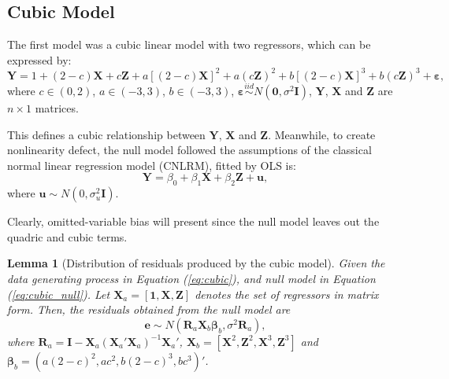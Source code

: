 \documentclass{monashthesis}
\newtheorem{lemma}{Lemma}[chapter]
\theoremstyle{definition}
\theoremstyle{definition}
\theoremstyle{definition}
\theoremstyle{definition}
\theoremstyle{remark}
\begin{document}
\hypertarget{cubic-model}{%
\subsection{Cubic Model}\label{cubic-model}}

The first model was a cubic linear model with two regressors, which can be expressed by:
\begin{equation} \label{eq:cubic}
\boldsymbol{Y}= 1 + (2-c)\boldsymbol{X} + c\boldsymbol{Z} + a[(2-c)\boldsymbol{X}]^2+a(c\boldsymbol{Z})^2+b[(2-c)\boldsymbol{X}]^3+b(c\boldsymbol{Z})^3+\boldsymbol{\varepsilon},
\end{equation}
where \(c \in (0,2)\), \(a \in (-3,3)\), \(b \in (-3,3)\), \(\boldsymbol{\varepsilon}\overset{iid}{\sim} N(\boldsymbol{0},\sigma^2\boldsymbol{I})\), \(\boldsymbol{Y}\), \(\boldsymbol{X}\) and \(\boldsymbol{Z}\) are \(n\times1\) matrices.

This defines a cubic relationship between \(\boldsymbol{Y}\), \(\boldsymbol{X}\) and \(\boldsymbol{Z}\). Meanwhile, to create nonlinearity defect, the null model followed the assumptions of the classical normal linear regression model (CNLRM), fitted by OLS is:
\begin{equation} \label{eq:cubic_null}
\boldsymbol{Y}=\beta_0+\beta_1\boldsymbol{X}+\beta_2\boldsymbol{Z}+\boldsymbol{u},
\end{equation}
where \(\boldsymbol{u} \sim N(0,\sigma^2_u\boldsymbol{I})\).

Clearly, omitted-variable bias will present since the null model leaves out the quadric and cubic terms.

\begin{lemma}[Distribution of residuals produced by the cubic model] \label{lemma:cubic}
Given the data generating process in Equation (\ref{eq:cubic}), and null model in Equation (\ref{eq:cubic_null}). Let $\boldsymbol{X}_a=[\boldsymbol{1},\boldsymbol{X},\boldsymbol{Z}]$ denotes the set of regressors in matrix form. Then, the residuals obtained from the null model are $$\boldsymbol{e} \sim N(\boldsymbol{R}_a\boldsymbol{X}_b\boldsymbol{\beta}_b, \sigma^2\boldsymbol{R}_a),$$ where $\boldsymbol{R}_a=\boldsymbol{I}-\boldsymbol{X}_a(\boldsymbol{X}_a'\boldsymbol{X}_a)^{-1}\boldsymbol{X}_a'$, $\boldsymbol{X}_b=[\boldsymbol{X}^2,\boldsymbol{Z}^2,\boldsymbol{X}^3,\boldsymbol{Z}^3]$ and $\boldsymbol{\beta}_b=(a(2-c)^2,ac^2,b(2-c)^3,bc^3)'$.
\end{lemma}
\end{document}
